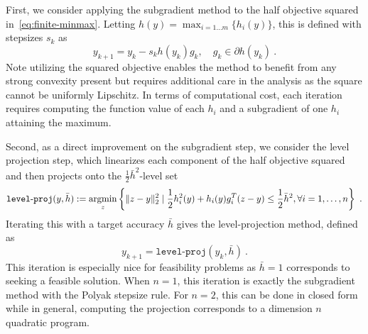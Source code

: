 \documentclass[sn-mathphys,Numbered]{sn-jnl}%
\newcommand{\argmin}{\operatornamewithlimits{argmin}}
\begin{document}
First, we consider applying the subgradient method to the half objective squared in~\eqref{eq:finite-minmax}. Letting $h(y) = \max_{i=1\dots m}\{h_i(y)\}$, this is defined with stepsizes $s_k$ as
\begin{equation} \label{eq:subgrad-method}
    y_{k+1} = y_k - s_k h(y_k)g_k, \quad g_k\in\partial h(y_k) \ . 
\end{equation}
Note utilizing the squared objective enables the method to benefit from any strong convexity present but requires additional care in the analysis as the square cannot be uniformly Lipschitz. In terms of computational cost, each iteration requires computing the function value of each $h_i$ and a subgradient of one $h_i$ attaining the maximum.

Second, as a direct improvement on the subgradient step, we consider the level projection step, which linearizes each component of the half objective squared and then projects onto the $\frac{1}{2}\bar h^2$-level set
\begin{equation}
    \mathtt{level\mbox{-}proj}(y,\bar h) := \argmin_{z}\left\{ \|z-y\|^2_2 \mid \frac{1}{2}h^2_i(y) + h_i(y)g_{i}^T(z-y) \leq \frac{1}{2}\bar h^2, \forall i=1, \dots ,n \right\} \ .  \label{eq:level-proj-step}
\end{equation}
Iterating this with a target accuracy $\bar h$ gives the level-projection method, defined as
\begin{equation} \label{eq:level-proj-method}
    y_{k+1} = \mathtt{level\mbox{-}proj}(y_k,\bar h) \ .
\end{equation}
This iteration is especially nice for feasibility problems as $\bar h=1$ corresponds to seeking a feasible solution. When $n=1$, this iteration is exactly the subgradient method with the Polyak stepsize rule. For $n=2$, this can be done in closed form while in general, computing the projection corresponds to a dimension $n$ quadratic program.  %
\end{document}
